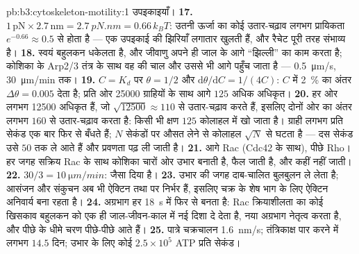 \begin{solution}{pb:b3:cytoskeleton-motility:1}
उपइकाइयाँ।
\textbf{17.} $1\,\text{pN}\times 2.7\,\text{nm} = \qty{2.7}{pN.nm} =
0.66\,k_{B}T$: उतनी ऊर्जा का कोई उतार-चढ़ाव लगभग प्रायिकता
$e^{-0.66} \approx 0.5$ से होता है --- एक उपइकाई की झिरियाँ लगातार
खुलती हैं, और रैचेट पूरी तरह संभाव्य है।
\textbf{18.} स्वयं बहुलकन धकेलता है, और जीवाणु अपने ही जाल के आगे
``झिल्ली'' का काम करता है; कोशिका के Arp2/3 तंत्र के साथ वह  की
चाल और उससे भी आगे पहुँच जाता है --- \qty{0.5}{\micro m/s},
\qty{30}{\micro m/min} तक।
\textbf{19.} $C = K_{d}$ पर $\theta = 1/2$ और $\mathrm{d}\theta/
\mathrm{d}C = 1/(4C)$: $C$ में \qty{2}{\%} का अंतर $\Delta\theta
= 0.005$ देता है; प्रति ओर \num{25000} ग्राहियों के साथ आगे $125$ अधिक
अधिकृत।
\textbf{20.} हर ओर लगभग \num{12500} अधिकृत हैं, जो
$\sqrt{\num{12500}} \approx 110$ से उतार-चढ़ाव करते हैं, इसलिए दोनों ओर
का अंतर लगभग $160$ से उतार-चढ़ाव करता है: किसी भी क्षण $125$ कोलाहल में
खो जाता है। ग्राही लगभग प्रति सेकंड एक बार फिर से बँधते हैं; $N$
सेकंडों पर औसत लेने से कोलाहल $\sqrt{N}$ से घटता है --- दस सेकंड उसे
$50$ तक ले आते हैं और प्रवणता पढ़ ली जाती है।
\textbf{21.} आगे Rac (Cdc42 के साथ), पीछे Rho। हर जगह सक्रिय
Rac के साथ कोशिका चारों ओर उभार बनाती है, फैल जाती है, और कहीं नहीं जाती।
\textbf{22.} $30/3 = \qty{10}{\micro m/min}$: जैसा दिया है।
\textbf{23.} उभार की जगह दाब-चालित बुलबुलन ले लेता है; आसंजन
और संकुचन अब भी ऐक्टिन तथा  पर निर्भर हैं, इसलिए चक्र के शेष
भाग के लिए ऐक्टिन अनिवार्य बना रहता है।
\textbf{24.} अग्रभाग हर \qty{18}{s} में फिर से बनता है: Rac
क्रियाशीलता का कोई खिसकाव बहुलकन को एक ही जाल-जीवन-काल में नई दिशा दे
देता है, नया अग्रभाग नेतृत्व करता है, और पीछे के धीमे चरण पीछे-पीछे आते हैं।
\textbf{25.} पात्रे चक्रचालन \qty{1.6}{nm/s}; तंत्रिकाक्ष पार करने में
लगभग $14.5$ दिन; उभार के लिए कोई $2.5\times 10^{5}$ ATP प्रति सेकंड।
\end{solution}
